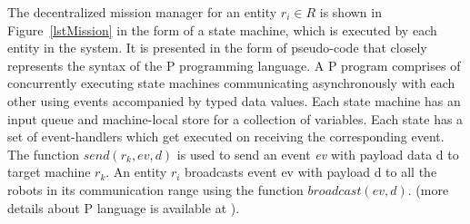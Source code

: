 \documentclass[journal]{IEEEtran}
\theoremstyle{definition}
\begin{document}
The decentralized mission manager for an entity $r_i \in R$ is shown in
Figure~\ref{lstMission} in the form of a state machine, which is executed by
each entity in the system. It is presented in the form of pseudo-code that closely represents the syntax of the P programming language.
A P program comprises of concurrently executing state machines communicating asynchronously with each other
using events accompanied by typed data values. Each state machine
has an input queue and machine-local store for a collection of variables. Each state has a set of event-handlers which
get executed on receiving the corresponding event. The function
$send(r_k, ev, d)$ is used to send an event \textit{ev} with payload data d
to target machine $r_k$. An entity $r_i$ broadcasts event ev with payload d to all the robots in its communication range using the function $broadcast (ev,d)$. (more details about P language is available at \cite{Plang}).
% 
%      
% 
%          
% 
% 
% 
%   
% 
% 
% 
\end{document}
